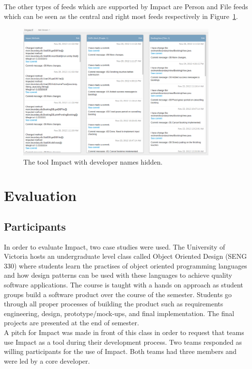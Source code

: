 \documentclass[conference]{IEEEtran}
\begin{document}
The other types of feeds which are supported by Impact are Person and File feeds which can be seen as
the central and right most feeds respectively in Figure~\ref{fig:impact}.\\

\begin{figure}[tb!]
\centering
\includegraphics[width=0.9\textwidth]{images/ImpactDemo}
\caption{The tool Impact with developer names hidden.\label{fig:impact}}
\end{figure}

\section{Evaluation}

\subsection{Participants}
In order to evaluate Impact, two case studies were used. The University of Victoria hosts an undergraduate
level class called Object Oriented Design (SENG 330) where students learn the practises of object oriented
programming languages and how design patterns can be used with these languages to achieve quality 
software applications. The course is taught with a hands on approach as student groups build a software
product over the course of the semester. Students go through all proper processes of building the product
such as requirements engineering, design, prototype/mock-ups, and final implementation. 
The final projects are presented at the end of semester. \\

A pitch for Impact was made in front of this class in order to request that teams use Impact as a tool during 
their development process. Two teams responded as willing participants for the use of Impact. Both teams 
had three members and were led by a core developer. \\
\end{document}
